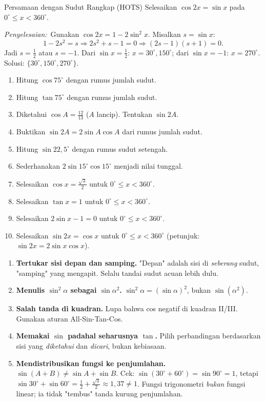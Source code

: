 \documentclass[11pt,a4paper]{report}
\theoremstyle{gaya}
\newcommand{\jawab}{\par\smallskip\noindent\textit{\textcolor{oranye}{Penyelesaian:}}\ }
\begin{document}
\begin{contoh}{Persamaan dengan Sudut Rangkap (HOTS)}
Selesaikan $\cos2x=\sin x$ pada $0^\circ\le x<360^\circ$.

\jawab Gunakan $\cos2x=1-2\sin^2x$. Misalkan $s=\sin x$:
\[
1-2s^2=s \Rightarrow 2s^2+s-1=0 \Rightarrow (2s-1)(s+1)=0.
\]
Jadi $s=\tfrac12$ atau $s=-1$. Dari $\sin x=\tfrac12$: $x=30^\circ,150^\circ$; dari $\sin x=-1$: $x=270^\circ$. Solusi: $\{30^\circ,150^\circ,270^\circ\}$.
\end{contoh}

\begin{latihan}
\begin{enumerate}[leftmargin=*]
  \item Hitung $\cos75^\circ$ dengan rumus jumlah sudut.
  \item Hitung $\tan75^\circ$ dengan rumus jumlah sudut.
  \item Diketahui $\cos A=\tfrac{12}{13}$ ($A$ lancip). Tentukan $\sin2A$.
  \item Buktikan $\sin2A=2\sin A\cos A$ dari rumus jumlah sudut.
  \item Hitung $\sin22{,}5^\circ$ dengan rumus sudut setengah.
  \item Sederhanakan $2\sin15^\circ\cos15^\circ$ menjadi nilai tunggal.
  \item Selesaikan $\cos x=\tfrac{\sqrt3}{2}$ untuk $0^\circ\le x<360^\circ$.
  \item Selesaikan $\tan x=1$ untuk $0^\circ\le x<360^\circ$.
  \item Selesaikan $2\sin x-1=0$ untuk $0^\circ\le x<360^\circ$.
  \item Selesaikan $\sin2x=\cos x$ untuk $0^\circ\le x<360^\circ$ (petunjuk: $\sin2x=2\sin x\cos x$).
\end{enumerate}
\end{latihan}

\begin{kesalahan}
\begin{enumerate}[leftmargin=*,topsep=2pt]
  \item \textbf{Tertukar sisi depan dan samping.} "Depan" adalah sisi di \emph{seberang} sudut, "samping" yang mengapit. Selalu tandai sudut acuan lebih dulu.
  \item \textbf{Menulis $\sin^2\alpha$ sebagai $\sin\alpha^2$.} $\sin^2\alpha=(\sin\alpha)^2$, bukan $\sin(\alpha^2)$.
  \item \textbf{Salah tanda di kuadran.} Lupa bahwa cos negatif di kuadran II/III. Gunakan aturan All-Sin-Tan-Cos.
  \item \textbf{Memakai $\sin$ padahal seharusnya $\tan$.} Pilih perbandingan berdasarkan sisi yang \emph{diketahui} dan \emph{dicari}, bukan kebiasaan.
  \item \textbf{Mendistribusikan fungsi ke penjumlahan.} $\sin(A+B)\neq\sin A+\sin B$. Cek: $\sin(30^\circ+60^\circ)=\sin90^\circ=1$, tetapi $\sin30^\circ+\sin60^\circ=\tfrac12+\tfrac{\sqrt3}{2}\approx1{,}37\neq 1$. Fungsi trigonometri \emph{bukan} fungsi linear; ia tidak "tembus" tanda kurung penjumlahan.
\end{enumerate}
\end{kesalahan}
\end{document}
